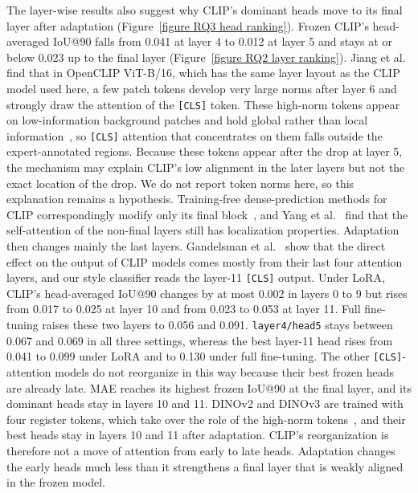 \documentclass[lineno,pdflatex,sn-mathphys-num]{sn-jnl}%
\theoremstyle{thmstyleone}%
\theoremstyle{thmstyletwo}%
\theoremstyle{thmstylethree}%
\begin{document}
The layer-wise results also suggest why CLIP's dominant heads move to its final layer after adaptation (Figure~\ref{figure RQ3 head ranking}). Frozen CLIP's head-averaged IoU@90 falls from 0.041 at layer 4 to 0.012 at layer 5 and stays at or below 0.023 up to the final layer (Figure~\ref{figure RQ2 layer ranking}). Jiang et al.~\cite{Jiang25Registers} find that in OpenCLIP ViT-B/16, which has the same layer layout as the CLIP model used here, a few patch tokens develop very large norms after layer 6 and strongly draw the attention of the \texttt{[CLS]} token. These high-norm tokens appear on low-information background patches and hold global rather than local information~\cite{Darcet24Registers}, so \texttt{[CLS]} attention that concentrates on them falls outside the expert-annotated regions. Because these tokens appear after the drop at layer 5, the mechanism may explain CLIP's low alignment in the later layers but not the exact location of the drop. We do not report token norms here, so this explanation remains a hypothesis. Training-free dense-prediction methods for CLIP correspondingly modify only its final block~\cite{Lan24ClearCLIP,Yang25ResCLIP}, and Yang et al.~\cite{Yang25ResCLIP} find that the self-attention of the non-final layers still has localization properties. Adaptation then changes mainly the last layers. Gandelsman et al.~\cite{Gandelsman24CLIPDecomp} show that the direct effect on the output of CLIP models comes mostly from their last four attention layers, and our style classifier reads the layer-11 \texttt{[CLS]} output. Under LoRA, CLIP's head-averaged IoU@90 changes by at most 0.002 in layers 0 to 9 but rises from 0.017 to 0.025 at layer 10 and from 0.023 to 0.053 at layer 11. Full fine-tuning raises these two layers to 0.056 and 0.091. \texttt{layer4/head5} stays between 0.067 and 0.069 in all three settings, whereas the best layer-11 head rises from 0.041 to 0.099 under LoRA and to 0.130 under full fine-tuning. The other \texttt{[CLS]}-attention models do not reorganize in this way because their best frozen heads are already late. MAE reaches its highest frozen IoU@90 at the final layer, and its dominant heads stay in layers 10 and 11. DINOv2 and DINOv3 are trained with four register tokens, which take over the role of the high-norm tokens~\cite{Darcet24Registers}, and their best heads stay in layers 10 and 11 after adaptation. CLIP's reorganization is therefore not a move of attention from early to late heads. Adaptation changes the early heads much less than it strengthens a final layer that is weakly aligned in the frozen model.
\end{document}
